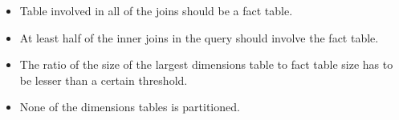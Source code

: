 \begin{itemize}
\item Table involved in all of the joins should be a fact table.
\item At least half of the inner joins in the query should involve the fact table.
\item The ratio of the size of the largest dimensions table to fact table size has to be lesser than a certain threshold.
\item None of the dimensions tables is partitioned.
\end{itemize}








